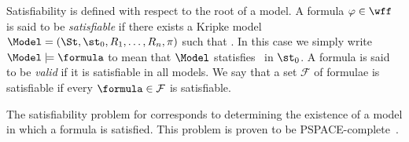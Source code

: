 
Satisfiability is defined with respect to the root of a model. A formula $\varphi
\in \wff$ is said to be \emph{satisfiable} if there exists a Kripke model
$\Model = (\St, \st_0, R_1, \ldots, R_n, \pi)$ such that
. In this case we simply write $\Model \models
\formula$ to mean that $\Model$ statisfies \formula~in $\st_0$. A formula is
said to be \emph{valid} if it is satisfiable in all models. We say that a set
$\mathcal{F}$ of formulae is satisfiable if every $\formula \in \mathcal{F}$ is
satisfiable.

The satisfiability problem for  corresponds to determining the
existence of a model in which a formula is satisfied. This problem is proven to be
PSPACE-complete~\cite{Spaan:coml}.


